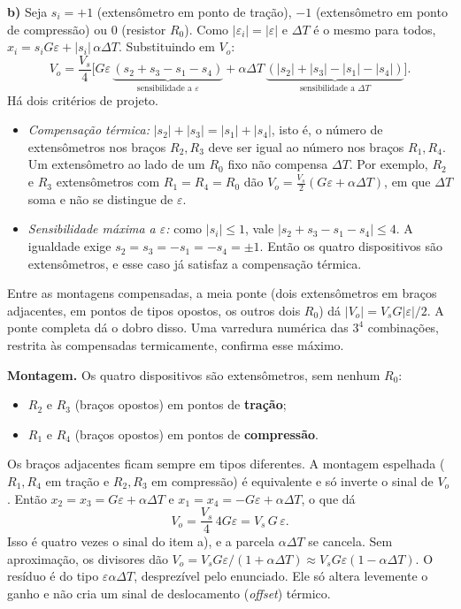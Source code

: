 \documentclass{article}%
\begin{document}
\textbf{b)} Seja $s_i=+1$ (extensômetro em ponto de tração), $-1$ (extensômetro em ponto de compressão) ou $0$ (resistor $R_0$). Como $|\varepsilon_i|=|\varepsilon|$ e $\Delta T$ é o mesmo para todos, $x_i=s_i G\varepsilon+|s_i|\,\alpha\Delta T$. Substituindo em $V_o$:
\[
V_o=\frac{V_s}{4}\Big[G\varepsilon\,\underbrace{(s_2+s_3-s_1-s_4)}_{\text{sensibilidade a }\varepsilon}+\alpha\Delta T\,\underbrace{(|s_2|+|s_3|-|s_1|-|s_4|)}_{\text{sensibilidade a }\Delta T}\Big].
\]
Há dois critérios de projeto.
\begin{itemize}
\item \emph{Compensação térmica:} $|s_2|+|s_3|=|s_1|+|s_4|$, isto é, o número de extensômetros nos braços $R_2,R_3$ deve ser igual ao número nos braços $R_1,R_4$. Um extensômetro ao lado de um $R_0$ fixo não compensa $\Delta T$. Por exemplo, $R_2$ e $R_3$ extensômetros com $R_1=R_4=R_0$ dão $V_o=\tfrac{V_s}{2}(G\varepsilon+\alpha\Delta T)$, em que $\Delta T$ soma e não se distingue de $\varepsilon$.
\item \emph{Sensibilidade máxima a $\varepsilon$:} como $|s_i|\le1$, vale $|s_2+s_3-s_1-s_4|\le4$. A igualdade exige $s_2=s_3=-s_1=-s_4=\pm1$. Então os quatro dispositivos são extensômetros, e esse caso já satisfaz a compensação térmica.
\end{itemize}
Entre as montagens compensadas, a meia ponte (dois extensômetros em braços adjacentes, em pontos de tipos opostos, os outros dois $R_0$) dá $|V_o|=V_sG|\varepsilon|/2$. A ponte completa dá o dobro disso. Uma varredura numérica das $3^4$ combinações, restrita às compensadas termicamente, confirma esse máximo.

\textbf{Montagem.} Os quatro dispositivos são extensômetros, sem nenhum $R_0$:
\begin{itemize}
\item $R_2$ e $R_3$ (braços opostos) em pontos de \textbf{tração};
\item $R_1$ e $R_4$ (braços opostos) em pontos de \textbf{compressão}.
\end{itemize}
Os braços adjacentes ficam sempre em tipos diferentes. A montagem espelhada ($R_1,R_4$ em tração e $R_2,R_3$ em compressão) é equivalente e só inverte o sinal de $V_o$. Então $x_2=x_3=G\varepsilon+\alpha\Delta T$ e $x_1=x_4=-G\varepsilon+\alpha\Delta T$, o que dá
\[
V_o=\frac{V_s}{4}\,4G\varepsilon=V_s\,G\,\varepsilon .
\]
Isso é quatro vezes o sinal do item a), e a parcela $\alpha\Delta T$ se cancela. Sem aproximação, os divisores dão $V_o=V_sG\varepsilon/(1+\alpha\Delta T)\approx V_sG\varepsilon(1-\alpha\Delta T)$. O resíduo é do tipo $\varepsilon\alpha\Delta T$, desprezível pelo enunciado. Ele só altera levemente o ganho e não cria um sinal de deslocamento (\emph{offset}) térmico.
\end{document}
